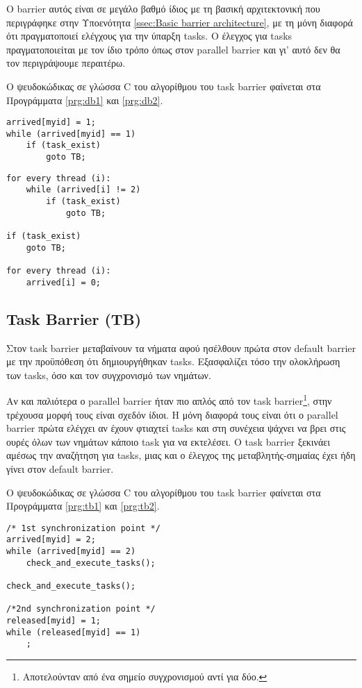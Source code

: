 Ο barrier αυτός είναι σε μεγάλο βαθμό ίδιος με τη βασική αρχιτεκτονική που περιγράφηκε στην Υποενότητα \ref{ssec:Basic barrier architecture}, με τη μόνη διαφορά ότι πραγματοποιεί ελέγχους για την ύπαρξη tasks. Ο έλεγχος για tasks πραγματοποιείται με τον ίδιο τρόπο όπως στον parallel barrier και γι' αυτό δεν θα τον περιγράψουμε περαιτέρω.

Ο ψευδοκώδικας σε γλώσσα C του αλγορίθμου του task barrier φαίνεται στα Προγράμματα \ref{prg:db1} και \ref{prg:db2}.

\begin{lstlisting}[label=prg:db1, caption=Default barrier για όλα τα νήματα πλην του νήματος-αρχηγού.]
arrived[myid] = 1;
while (arrived[myid] == 1)
    if (task_exist)
        goto TB;
\end{lstlisting}

\begin{lstlisting}[label=prg:db2, caption=Default barrier για το νήμα-αρχηγό.]
for every thread (i):
    while (arrived[i] != 2)
        if (task_exist)
            goto TB;

if (task_exist)
    goto TB;
     
for every thread (i):
    arrived[i] = 0;
\end{lstlisting}


\subsection{Task Barrier (TB)}
\label{ssec:tb}
Στον task barrier μεταβαίνουν τα νήματα αφού ησέλθουν πρώτα στον default barrier με την προϋπόθεση ότι δημιουργήθηκαν tasks. Εξασφαλίζει τόσο την ολοκλήρωση των tasks, όσο και τον συγχρονισμό των νημάτων.

Αν και παλιότερα ο parallel barrier ήταν πιο απλός από τον task barrier\footnote{Αποτελούνταν από ένα σημείο συγχρονισμού αντί για δύο.}, στην τρέχουσα μορφή τους είναι σχεδόν ίδιοι. Η μόνη διαφορά τους είναι ότι ο parallel barrier πρώτα ελέγχει αν έχουν φτιαχτεί tasks και στη συνέχεια ψάχνει να βρει στις ουρές όλων των νημάτων κάποιο task για να εκτελέσει. Ο task barrier ξεκινάει αμέσως την αναζήτηση για tasks, μιας και ο έλεγχος της μεταβλητής-σημαίας έχει ήδη γίνει στον default barrier.

Ο ψευδοκώδικας σε γλώσσα C του αλγορίθμου του task barrier φαίνεται στα Προγράμματα \ref{prg:tb1} και \ref{prg:tb2}.

\begin{lstlisting}[label=prg:tb1, caption=Task barrier για όλα τα νήματα πλην του νήματος-αρχηγού.]
/* 1st synchronization point */
arrived[myid] = 2;
while (arrived[myid] == 2)
    check_and_execute_tasks();
    
check_and_execute_tasks();
    
/*2nd synchronization point */
released[myid] = 1;
while (released[myid] == 1)
    ;
\end{lstlisting}

